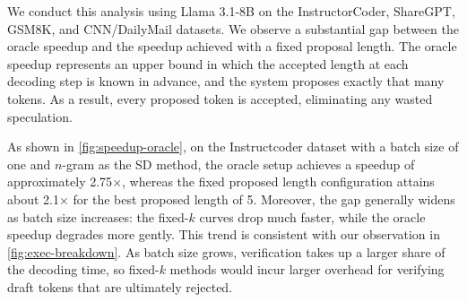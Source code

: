 We conduct this analysis using Llama 3.1-8B on the InstructorCoder, ShareGPT, GSM8K, and CNN/DailyMail datasets. We observe a substantial gap between the oracle speedup and the speedup achieved with a fixed proposal length. The oracle speedup represents an upper bound in which the accepted length at each decoding step is known in advance, and the system proposes exactly that many tokens. As a result, every proposed token is accepted, eliminating any wasted speculation.

 As shown in \autoref{fig:speedup-oracle}, on the Instructcoder dataset with a batch size of one and $n$-gram as the SD method, the oracle setup achieves a speedup of approximately 2.75$\times$, whereas the fixed proposed length configuration attains about 2.1$\times$ for the best proposed length of 5. Moreover, the gap generally widens as batch size increases: the fixed-$k$ curves drop much faster, while the oracle speedup degrades more gently. This trend is consistent with our observation in \autoref{fig:exec-breakdown}. As batch size grows, verification takes up a larger share of the decoding time, so fixed-$k$ methods would incur larger overhead for verifying draft tokens that are ultimately rejected.





